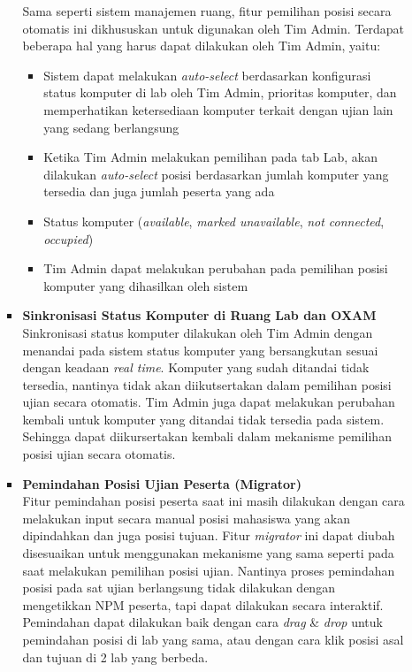 \documentclass[a4paper,twoside]{article}
\begin{document}
\begin{enumerate}
\begin{itemize}
\begin{itemize}
            	    Sama seperti sistem manajemen ruang, fitur pemilihan posisi secara otomatis ini dikhususkan untuk digunakan oleh Tim Admin. Terdapat beberapa hal yang harus dapat dilakukan oleh Tim Admin, yaitu:
            	    \begin{itemize}
            	        \item Sistem dapat melakukan \textit{auto-select} berdasarkan konfigurasi status komputer di lab oleh Tim Admin, prioritas komputer, dan memperhatikan ketersediaan komputer terkait dengan ujian lain yang sedang berlangsung
            	        \item Ketika Tim Admin melakukan pemilihan pada tab Lab, akan dilakukan \textit{auto-select} posisi berdasarkan jumlah komputer yang tersedia dan juga jumlah peserta yang ada
            	        \item Status komputer (\textit{available}, \textit{marked unavailable}, \textit{not connected}, \textit{occupied}) 
            	        \item Tim Admin dapat melakukan perubahan pada pemilihan posisi komputer yang dihasilkan oleh sistem
            	    \end{itemize}
	                
	                \vspace{0.3cm}
	    
            		\item \textbf{Sinkronisasi Status Komputer di Ruang Lab dan OXAM}\\
            		\label{sinkronisasi-status}
            	    Sinkronisasi status komputer dilakukan oleh Tim Admin dengan menandai pada sistem status komputer yang bersangkutan sesuai dengan keadaan \textit{real time}. Komputer yang sudah ditandai tidak tersedia, nantinya tidak akan diikutsertakan dalam pemilihan posisi ujian secara otomatis. Tim Admin juga dapat melakukan perubahan kembali untuk komputer yang ditandai tidak tersedia pada sistem. Sehingga dapat diikursertakan kembali dalam mekanisme pemilihan posisi ujian secara otomatis. 
            	    
            	    \vspace{0.3cm}
            	    
            	    \item \textbf{Pemindahan Posisi Ujian Peserta (Migrator)}\\
            	    \label{migrator}
            	    Fitur pemindahan posisi peserta saat ini masih dilakukan dengan cara melakukan input secara manual posisi mahasiswa yang akan dipindahkan dan juga posisi tujuan. Fitur \textit{migrator} ini dapat diubah disesuaikan untuk menggunakan mekanisme yang sama seperti pada saat melakukan pemilihan posisi ujian. Nantinya proses pemindahan posisi pada sat ujian berlangsung tidak dilakukan dengan mengetikkan NPM peserta, tapi dapat dilakukan secara interaktif. Pemindahan dapat dilakukan baik dengan cara \textit{drag} \& \textit{drop} untuk pemindahan posisi di lab yang sama, atau dengan cara klik posisi asal dan tujuan di 2 lab yang berbeda.
            	    

\end{itemize}
\end{itemize}
\end{enumerate}
\end{document}
